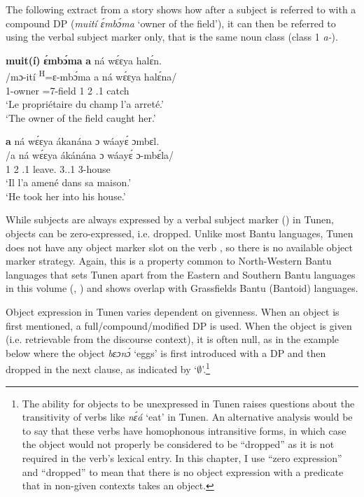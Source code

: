 \documentclass[output=paper,colorlinks,citecolor=brown
]{langscibook}
\begin{document}
The following extract from a story shows how after a subject is referred to with a compound DP (\textit{muití ɛ́mbɔ́ma} `owner of the field'), it can then be referred to using the verbal subject marker only, that is the same noun class (class 1 \SM{} \textit{a-}). 

\ea
\ea
\glll
{\db}\textbf{muit(í)} \textbf{ɛ́mbɔ́ma} \textbf{a} ná wɛ́ɛya halɛ́n.  \\
/mɔ-ití \textsuperscript{H}=ɛ-mbɔ́ma a ná wɛ́ɛya halɛ́na/ \\
{\db}1-owner \ASS{}=7-field 1\SM{} \PST{}2{} \PRO{}.1{} catch \\
\glt
`Le propriétaire du champ l'a arreté.' \\ `The owner of the field caught her.'  \jambox*{[JO 1765] }

\ex
\glll
{\db}\textbf{a} ná wɛ́ɛya ákanána ɔ wáayɛ́ ɔmbɛl. \\
/a ná wɛ́ɛya ákánána ɔ wáayɛ́ ɔ-mbɛ́la/ \\
{\db}1\SM{} \PST{}2{} \PRO{}.1{} leave.\APPL{} \PREP{} 3{}.\POSS{}.1 3-house \\
\glt
`Il l'a amené dans sa maison.' \\ `He took her into his house.' \jambox*{[JO 1766] }

\z
\z

While subjects are always expressed by a verbal subject marker (\SM{}) in Tunen, objects can be zero-expressed, i.e. dropped. Unlike most Bantu languages, Tunen does not have any object marker slot on the verb \citep[107]{KerrFut}, so there is no available object marker strategy. Again, this is a property common to North-Western Bantu languages that sets Tunen apart from the Eastern and Southern Bantu languages in this volume (\citealt{Polak1986}, \citealt[69--70]{vanderWal2022}) and shows overlap with Grassfields Bantu (Bantoid) languages.

Object expression in Tunen varies dependent on givenness. When an object is first mentioned, a full/compound/modified DP is used. When the object is given (i.e. retrievable from the discourse context), it is often null, as in the example below where the object \textit{bɛɔnɔ́} `eggs' is first introduced with a DP and then dropped in the next clause, as indicated by `$\emptyset$'.\footnote{The ability for objects to be unexpressed in Tunen raises questions about the transitivity of verbs like \textit{nɛ́á} `eat' in Tunen. An alternative analysis would be to say that these verbs have homophonous intransitive forms, in which case the object would not properly be considered to be ``dropped'' as it is not required in the verb's lexical entry. In this chapter, I use ``zero expression'' and ``dropped'' to mean that there is no object expression with a predicate that in non-given contexts takes an object.}
\end{document}

